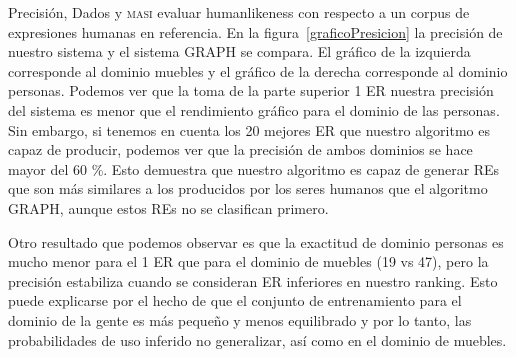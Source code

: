 Precisi\'on, Dados y \textsc{masi}  evaluar humanlikeness con respecto a un corpus de expresiones humanas en referencia. En la figura~\ref{graficoPresicion} la precisi\'on de nuestro sistema y el sistema GRAPH se compara. El gr\'afico de la izquierda corresponde al dominio muebles y el gr\'afico de la derecha corresponde al dominio personas. Podemos ver que la toma de la parte superior 1 ER nuestra precisi\'on del sistema es menor que el rendimiento gr\'afico para el dominio de las personas. Sin embargo, si tenemos en cuenta los 20 mejores ER que nuestro algoritmo es capaz de producir, podemos ver que la precisi\'on de ambos dominios se hace mayor del 60 \%. Esto demuestra que nuestro algoritmo es capaz de generar REs que son m\'as similares a los producidos por los seres humanos que el algoritmo GRAPH, aunque estos REs no se clasifican primero.

Otro resultado que podemos observar es que la exactitud de dominio personas es mucho menor para el 1 ER que para el dominio de muebles (19 vs 47), pero la precisi\'on estabiliza cuando se consideran ER inferiores en nuestro ranking. Esto puede explicarse por el hecho de que el conjunto de entrenamiento para el dominio de la gente es m\'as peque\~no y menos equilibrado y por lo tanto, las probabilidades de uso inferido no generalizar, as\'{i} como en el dominio de muebles.

